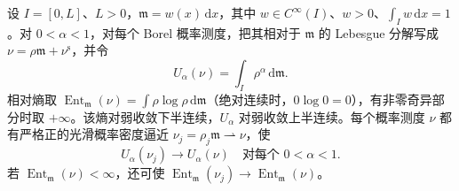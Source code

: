 \begin{lemma}\label{g3:lem:C-entropy-recovery}
	设 \(I=[0,L]\)、\(L>0\)，\(\mathfrak m=w(x)\,\mathrm dx\)，其中 \(w\in C^\infty(I)\)、\(w>0\)、\(\int_Iw\,\mathrm dx=1\)。对 \(0<\alpha<1\)，对每个 Borel 概率测度，把其相对于 \(\mathfrak m\) 的 Lebesgue 分解写成
	\(\nu=\rho\mathfrak m+\nu^{\mathrm s}\)，并令
	\[
		U_\alpha(\nu)=\int_I\rho^\alpha\,\mathrm d\mathfrak m.
	\]
	相对熵取 \(\operatorname{Ent}_{\mathfrak m}(\nu)=\int\rho\log\rho\,\mathrm d\mathfrak m\)（绝对连续时，\(0\log0=0\)），有非零奇异部分时取 \(+\infty\)。该熵对弱收敛下半连续，\(U_\alpha\) 对弱收敛上半连续。每个概率测度 \(\nu\) 都有严格正的光滑概率密度逼近
	\(\nu_j=\rho_j\mathfrak m\rightharpoonup\nu\)，使
	\[
		U_\alpha(\nu_j)\longrightarrow U_\alpha(\nu)
		\quad\text{对每个 }0<\alpha<1.
	\]
	若 \(\operatorname{Ent}_{\mathfrak m}(\nu)<\infty\)，还可使
	\(\operatorname{Ent}_{\mathfrak m}(\nu_j)\to
	\operatorname{Ent}_{\mathfrak m}(\nu)\)。
\end{lemma}
